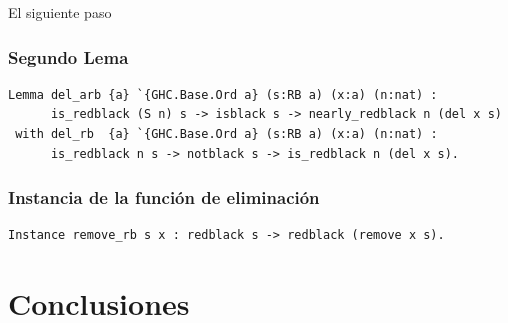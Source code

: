 \documentclass[8pt,leqno,pdflatex,spanish]{book}
\theoremstyle{plain}
\theoremstyle{definition}
\theoremstyle{remark}
\begin{document}
El siguiente paso 

\subsection{Segundo Lema}
\begin{verbatim}
Lemma del_arb {a} `{GHC.Base.Ord a} (s:RB a) (x:a) (n:nat) :
      is_redblack (S n) s -> isblack s -> nearly_redblack n (del x s)
 with del_rb  {a} `{GHC.Base.Ord a} (s:RB a) (x:a) (n:nat) :
      is_redblack n s -> notblack s -> is_redblack n (del x s).
\end{verbatim}

\subsection{Instancia de la funci\'on de eliminaci\'on}
\begin{verbatim}
Instance remove_rb s x : redblack s -> redblack (remove x s).
\end{verbatim}
\chapter{Conclusiones}  

 
\backmatter%
\end{document}
